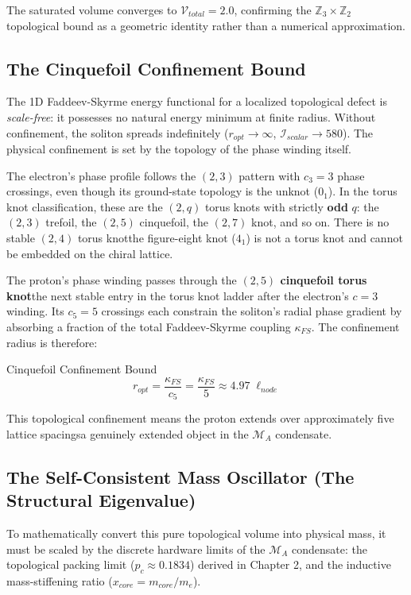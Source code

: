 The saturated volume converges to $\mathcal{V}_{total} = 2.0$, confirming the $\mathbb{Z}_3 \times \mathbb{Z}_2$ topological bound as a geometric identity rather than a numerical approximation.

\subsection{The Cinquefoil Confinement Bound}

The 1D Faddeev-Skyrme energy functional for a localized topological defect is \textit{scale-free}: it possesses no natural energy minimum at finite radius. Without confinement, the soliton spreads indefinitely ($r_{opt} \to \infty$, $\mathcal{I}_{scalar} \to 580$). The physical confinement is set by the topology of the phase winding itself.

The electron's phase profile follows the $(2,3)$ pattern with $c_3 = 3$ phase crossings, even though its ground-state topology is the unknot ($0_1$). In the torus knot classification, these are the $(2,q)$ torus knots with strictly \textbf{odd} $q$: the $(2,3)$ trefoil, the $(2,5)$ cinquefoil, the $(2,7)$ knot, and so on. There is no stable $(2,4)$ torus knot\textemdash the figure-eight knot ($4_1$) is not a torus knot and cannot be embedded on the chiral lattice.

The proton's phase winding passes through the \textbf{$(2,5)$ cinquefoil torus knot}\textemdash the next stable entry in the torus knot ladder after the electron's $c=3$ winding. Its $c_5 = 5$ crossings each constrain the soliton's radial phase gradient by absorbing a fraction of the total Faddeev-Skyrme coupling $\kappa_{FS}$. The confinement radius is therefore:
\begin{resultbox}{Cinquefoil Confinement Bound}
\begin{equation}
    r_{opt} = \frac{\kappa_{FS}}{c_5} = \frac{\kappa_{FS}}{5} \approx 4.97 \; \ell_{node}
\end{equation}
\end{resultbox}

This topological confinement means the proton extends over approximately five lattice spacings\textemdash a genuinely extended object in the $\mathcal{M}_A$ condensate.

\subsection{The Self-Consistent Mass Oscillator (The Structural Eigenvalue)}
To mathematically convert this pure topological volume into physical mass, it must be scaled by the discrete hardware limits of the $\mathcal{M}_A$ condensate: the topological packing limit ($p_c \approx 0.1834$) derived in Chapter 2, and the inductive mass-stiffening ratio ($x_{core} = m_{core}/m_e$).

